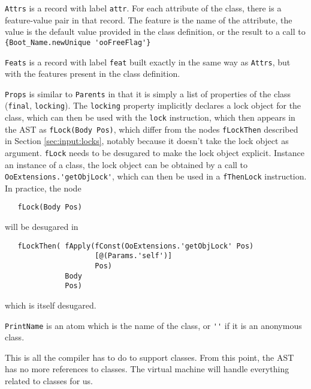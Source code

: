 \documentclass[a4paper]{memoir}
\begin{document}
\lstinline!Attrs! is a record with label \lstinline!attr!.
For each attribute of the class, there is a feature-value pair in that record.
The feature is the name of the attribute, the value is the default value
provided in the class definition, or the result to a call to
\lstinline!{Boot_Name.newUnique 'ooFreeFlag'}!

\lstinline!Feats! is a record with label \lstinline!feat! built exactly in the
same way as \lstinline!Attrs!, but with the features present in the class
definition.

\lstinline!Props! is similar to \lstinline!Parents! in that it is simply a list of properties of the class (\lstinline!final!,
\lstinline!locking!). The \lstinline!locking! property implicitly declares a
lock object for the class, which can then be used with the \lstinline!lock!
instruction, which then appears in the AST as \lstinline!fLock(Body Pos)!, which
differ from the nodes \lstinline!fLockThen! described in Section
\ref{sec:input:locks}, notably because it doesn't take the lock object as
argument. \lstinline!fLock!
needs to be desugared to make the lock object explicit. Instance an instance of
a class, the lock object can be obtained by a call to
\lstinline!OoExtensions.'getObjLock'!, which can then be used in a
\lstinline!fThenLock! instruction. In practice, the node
\label{desugar:classes:lock}
\begin{lstlisting}
   fLock(Body Pos)
\end{lstlisting}

will be desugared in 

\begin{lstlisting}
   fLockThen( fApply(fConst(OoExtensions.'getObjLock' Pos) 
                     [@(Params.'self')] 
                     Pos)
              Body 
              Pos)  
\end{lstlisting}
which is itself desugared.

\lstinline!PrintName! is an atom which is the name of the class, or \lstinline!''! if it is
an anonymous class.

This is all the compiler has to do to support classes. From this point, the AST
has no more references to classes. The virtual machine will handle everything related to classes for us.
\end{document}
